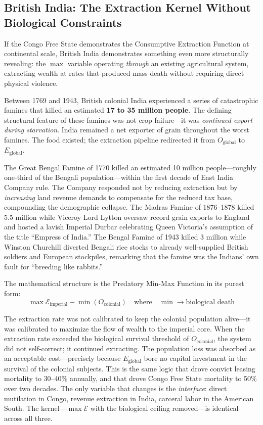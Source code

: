 \documentclass[12pt,openany]{book}
\begin{document}
\subsection{British India: The Extraction Kernel Without Biological Constraints}

If the Congo Free State demonstrates the Consumptive Extraction Function at continental scale, British India demonstrates something even more structurally revealing: the $\max$ variable operating \textit{through} an existing agricultural system, extracting wealth at rates that produced mass death without requiring direct physical violence.

Between 1769 and 1943, British colonial India experienced a series of catastrophic famines that killed an estimated \textbf{17 to 35 million people}. The defining structural feature of these famines was not crop failure---it was \textit{continued export during starvation}. India remained a net exporter of grain throughout the worst famines. The food existed; the extraction pipeline redirected it from $O_{\text{global}}$ to $E_{\text{global}}$.

The Great Bengal Famine of 1770 killed an estimated 10 million people---roughly one-third of the Bengali population---within the first decade of East India Company rule. The Company responded not by reducing extraction but by \textit{increasing} land revenue demands to compensate for the reduced tax base, compounding the demographic collapse. The Madras Famine of 1876--1878 killed 5.5 million while Viceroy Lord Lytton oversaw record grain exports to England and hosted a lavish Imperial Durbar celebrating Queen Victoria's assumption of the title ``Empress of India.'' The Bengal Famine of 1943 killed 3 million while Winston Churchill diverted Bengali rice stocks to already well-supplied British soldiers and European stockpiles, remarking that the famine was the Indians' own fault for ``breeding like rabbits.''

The mathematical structure is the Predatory Min-Max Function in its purest form:
\[
\max \mathcal{E}_{\text{imperial}} - \min(O_{\text{colonial}}) \quad \text{where} \quad \min \rightarrow \text{biological death}
\]

The extraction rate was not calibrated to keep the colonial population alive---it was calibrated to maximize the flow of wealth to the imperial core. When the extraction rate exceeded the biological survival threshold of $O_{\text{colonial}}$, the system did not self-correct; it continued extracting. The population loss was absorbed as an acceptable cost---precisely because $E_{\text{global}}$ bore no capital investment in the survival of the colonial subjects. This is the same logic that drove convict leasing mortality to 30--40\% annually, and that drove Congo Free State mortality to 50\% over two decades. The only variable that changes is the \textit{interface}: direct mutilation in Congo, revenue extraction in India, carceral labor in the American South. The kernel---$\max \mathcal{E}$ with the biological ceiling removed---is identical across all three.
\end{document}
